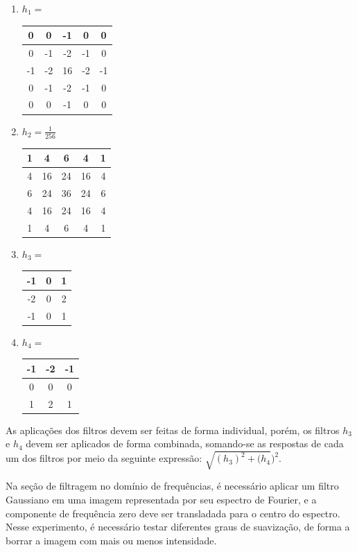 \documentclass[twoside,twocolumn]{article}
\begin{document}
\begin{enumerate}[label=(\alph*)]
\item $h_{1} = $ \begin{tabular}[H]{|c|c|c|c|c|}
\hline
0  & 0  & -1 & 0  & 0  \\ \hline
0  & -1 & -2 & -1 & 0  \\ \hline
-1 & -2 & 16 & -2 & -1 \\ \hline
0  & -1 & -2 & -1 & 0  \\ \hline
0  & 0  & -1 & 0  & 0  \\ \hline
\end{tabular}

\item $h_{2} = \frac{1}{256}$ \begin{tabular}{|c|c|c|c|c|}
\hline
1 & 4  & 6  & 4  & 1 \\ \hline
4 & 16 & 24 & 16 & 4 \\ \hline
6 & 24 & 36 & 24 & 6 \\ \hline
4 & 16 & 24 & 16 & 4 \\ \hline
1 & 4  & 6  & 4  & 1 \\ \hline
\end{tabular}

\item $h_{3} = $ \begin{tabular}{|c|c|c|}
\hline
-1 & 0 & 1 \\ \hline
-2 & 0 & 2 \\ \hline
-1 & 0 & 1 \\ \hline
\end{tabular}

\item $h_{4} = $ \begin{tabular}{|c|c|c|}
\hline
-1 & -2 & -1 \\ \hline
0  & 0  & 0  \\ \hline
1  & 2  & 1  \\ \hline
\end{tabular}
\end{enumerate}

As aplicações dos filtros devem ser feitas de forma individual, porém, os filtros $h_{3}$ e $h_{4}$ devem ser aplicados de forma combinada, somando-se as respostas de cada um dos filtros por meio da seguinte expressão: $\sqrt{(h_{3})^{2} + (h_{4}})^{2}$.

Na seção de filtragem no domínio de frequências, é necessário aplicar um filtro Gaussiano em uma imagem representada por seu espectro de Fourier, e a componente de frequência zero deve ser transladada para o centro do espectro. Nesse experimento, é necessário testar diferentes graus de suavização, de forma a borrar a imagem com mais ou menos intensidade.
\end{document}
